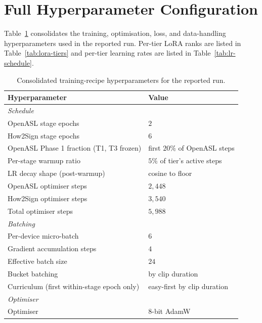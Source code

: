 \documentclass{article}
\begin{document}
\appendix

\section{Full Hyperparameter Configuration}
\label{app:hyperparams}

Table~\ref{tab:hparams} consolidates the training, optimisation, loss, and
data-handling hyperparameters used in the reported run. Per-tier LoRA ranks
are listed in Table~\ref{tab:lora-tiers} and per-tier learning rates are
listed in Table~\ref{tab:lr-schedule}.

\begin{table}[H]
\centering
\caption{Consolidated training-recipe hyperparameters for the reported run.}
\label{tab:hparams}
\begin{tabular}{l l}
\toprule
Hyperparameter                              & Value \\
\midrule
\multicolumn{2}{l}{\emph{Schedule}} \\
OpenASL stage epochs                        & $2$ \\
How2Sign stage epochs                       & $6$ \\
OpenASL Phase 1 fraction (T1, T3 frozen)    & first $20\%$ of OpenASL steps \\
Per-stage warmup ratio                      & $5\%$ of tier's active steps \\
LR decay shape (post-warmup)                & cosine to floor \\
OpenASL optimiser steps                     & $2{,}448$ \\
How2Sign optimiser steps                    & $3{,}540$ \\
Total optimiser steps                       & $5{,}988$ \\
\midrule
\multicolumn{2}{l}{\emph{Batching}} \\
Per-device micro-batch                      & $6$ \\
Gradient accumulation steps                 & $4$ \\
Effective batch size                        & $24$ \\
Bucket batching                             & by clip duration \\
Curriculum (first within-stage epoch only)  & easy-first by clip duration \\
\midrule
\multicolumn{2}{l}{\emph{Optimiser}} \\
Optimiser                                   & 8-bit AdamW \\

\end{tabular}
\end{table}
\end{document}
